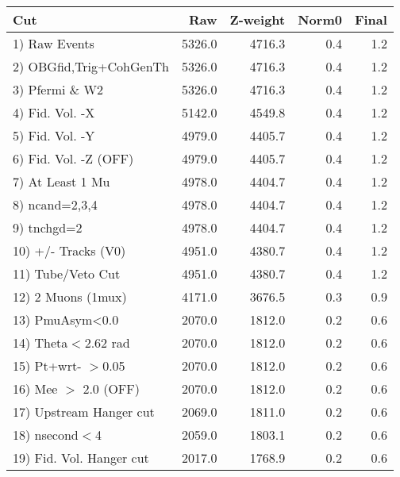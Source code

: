  \begin{table}[h!]\centering
 \begin{tabular}{||l||r|r|r|r||}
 \hline
 \hline
 Cut & Raw & Z-weight & Norm0 & Final \\
 \hline
  1) Raw Events           &      5326.0 &      4716.3 &         0.4 &         1.2 \\
  2) OBGfid,Trig+CohGenTh &      5326.0 &      4716.3 &         0.4 &         1.2 \\
  3) Pfermi \& W2         &      5326.0 &      4716.3 &         0.4 &         1.2 \\
  4) Fid. Vol. -X         &      5142.0 &      4549.8 &         0.4 &         1.2 \\
  5) Fid. Vol. -Y         &      4979.0 &      4405.7 &         0.4 &         1.2 \\
  6) Fid. Vol. -Z (OFF)   &      4979.0 &      4405.7 &         0.4 &         1.2 \\
  7) At Least 1 Mu        &      4978.0 &      4404.7 &         0.4 &         1.2 \\
  8) ncand=2,3,4          &      4978.0 &      4404.7 &         0.4 &         1.2 \\
  9) tnchgd=2             &      4978.0 &      4404.7 &         0.4 &         1.2 \\
 10) +/- Tracks (V0)      &      4951.0 &      4380.7 &         0.4 &         1.2 \\
 11) Tube/Veto Cut        &      4951.0 &      4380.7 &         0.4 &         1.2 \\
 12) 2 Muons (1mux)       &      4171.0 &      3676.5 &         0.3 &         0.9 \\
 13) PmuAsym<0.0          &      2070.0 &      1812.0 &         0.2 &         0.6 \\
 14) Theta$<$2.62 rad     &      2070.0 &      1812.0 &         0.2 &         0.6 \\
 15) Pt+wrt- $>$0.05      &      2070.0 &      1812.0 &         0.2 &         0.6 \\
 16) Mee $>$ 2.0  (OFF)   &      2070.0 &      1812.0 &         0.2 &         0.6 \\
 17) Upstream Hanger cut  &      2069.0 &      1811.0 &         0.2 &         0.6 \\
 18) nsecond$<$4          &      2059.0 &      1803.1 &         0.2 &         0.6 \\
 19) Fid. Vol. Hanger cut &      2017.0 &      1768.9 &         0.2 &         0.6 \\

\end{tabular}
\end{table}
